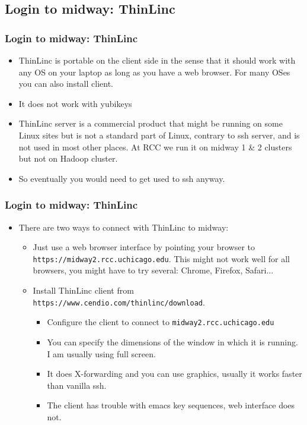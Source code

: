 \documentclass{beamer}
\begin{document}
\subsection{Login to midway: ThinLinc}
\begin{frame}[fragile]
  \frametitle{Login to midway: ThinLinc}
  \begin{itemize}
  \item ThinLinc is portable on the client side in the sense that it should work with any OS on your laptop as long as you have a web browser. For many OSes you can also install client.
  \item It does not work with yubikeys
  \item ThinLinc server is a commercial product that might be running on some Linux sites but is not a standard part of Linux, contrary to ssh server, 
    and is not used in most other places. At RCC we run it on midway 1 \& 2 clusters but not on Hadoop cluster.
  \item So eventually you would need to get used to ssh anyway.
  \end{itemize}
\end{frame}

\begin{frame}[fragile]
  \frametitle{Login to midway: ThinLinc}
  \begin{itemize}
    \item There are two ways to connect with ThinLinc to midway:
      \begin{itemize}
        \item Just use a web browser interface by pointing your browser to {\color{mycolorcli}\verb|https://midway2.rcc.uchicago.edu|}. 
          This might not work well for all browsers, you might have to try several: Chrome, Firefox, Safari...
        \item Install ThinLinc client from {\color{mycolorcli}\verb|https://www.cendio.com/thinlinc/download|}. 
          \begin{itemize}
          \item Configure the client to connect to {\color{mycolorcli}\verb|midway2.rcc.uchicago.edu|}
          \item You can specify the dimensions of the window in which it is running. I am usually using full screen.
          \item It does X-forwarding and you can use graphics, usually it works faster than vanilla ssh.
          \item The client has trouble with emacs key sequences, web interface does not.
          \end{itemize}
      \end{itemize}
  \end{itemize}
\end{frame}
\end{document}
